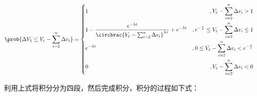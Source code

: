 \documentclass[11pt]{article}
\begin{document}
\begin{align}
  \prob{\Delta V_1\le V_\varepsilon-\sum_{i=2}^{n}\Delta v_i}=\left\{\begin{aligned}
    & 1                                                                     & , V_\varepsilon-\sum_{i=2}^{n}\Delta v_i>1                              \\
    & \displaystyle 1-\frac{e^{-\lambda t}}{\circbrac{ V_\varepsilon-\sum_{i=2}^{n}\Delta v_i}^{\lambda\tau}}+e^{-\lambda t} & , e^{-\frac{t}{\tau}} \le  V_\varepsilon-\sum_{i=2}^{n}\Delta v_i \le 1 \\
    & e^{-\lambda t}                                                        & ,0\le  V_\varepsilon-\sum_{i=2}^{n}\Delta v_i<e^{-\frac{t}{\tau}}\\
    & 0                                                                     & , V_\varepsilon-\sum_{i=2}^{n}\Delta v_i<0
 \end{aligned}\right.
\end{align}\par
利用上式将积分分为四段，然后完成积分，积分的过程如下式：
\end{document}
